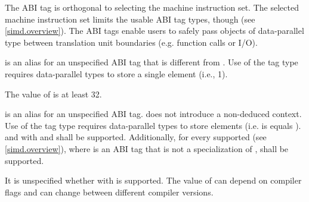 \pnum
\begin{note}The ABI tag is orthogonal to selecting the machine instruction set. The selected machine instruction set limits the usable ABI tag types, though (see \ref{simd.overview}). The ABI tags enable users to safely pass objects of data-parallel type between translation unit boundaries (e.g. function calls or I/O).\end{note}

\pnum
{} is an alias for an unspecified ABI tag that is different from .
Use of the  tag type requires data-parallel types to store a single element (i.e.,  1).

\pnum
The value of  is at least 32.

\pnum
{} is an alias for an unspecified ABI tag.
 does not introduce a non-deduced context.
Use of the  tag type requires data-parallel types to store 
elements (i.e.
\wgChange
  { is}
  { equals}
).  and  with  and  shall be supported.
Additionally, for every supported  (see \ref{simd.overview}), where 
is an ABI tag that is not a specialization of ,  shall be supported.

\pnum
\begin{note}It is unspecified whether  with  is supported. The value of  can depend on compiler flags and can change between different compiler versions.\end{note}

\begin{wgBAdd}
\pnum
{}
\end{wgBAdd}

\begin{wgBRem}
\pnum
{}
\end{wgBRem}

